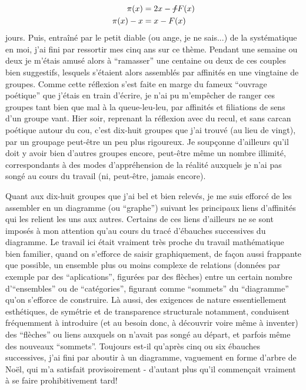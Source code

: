 \[
\begin{aligned}
\pi(x)&=2x-\deleted{f}F(x)\\
\pi(x)-x&=x-F(x)
\end{aligned}
\]
jours. Puis, entraîné par le petit diable (ou ange, je ne sais...) de la systématique en moi, j'ai fini par ressortir mes  cinq ans sur ce thème. Pendant une semaine ou deux je m'étais amusé alors à ``ramasser'' une centaine ou deux de ces couples bien suggestifs, lesquels s'étaient alors assemblés par affinités en une vingtaine de groupes. Comme cette réflexion s'est faite en marge du fameux ``ouvrage poétique'' que j'étais en train d'écrire, je n'ai pu m'empêcher de ranger ces groupes tant bien que mal à la queue-leu-leu, par affinités et filiations de sens d'un groupe vant. Hier soir, reprenant la réflexion avec du recul, et sans carcan poétique autour du cou, c'est dix-huit groupes que j'ai trouvé (au lieu de vingt), par un groupage peut-être un peu plus rigoureux. Je soupçonne d'ailleurs qu'il doit y avoir bien d'autres groupes encore, peut-être même un nombre illimité, correspondants à des modes d'appréhension de la réalité auxquels je n'ai pas songé au cours du travail (ni, peut-être, jamais encore).

Quant aux dix-huit groupes que j'ai bel et bien relevés, je me suis efforcé de les assembler en un diagramme (ou ``graphe'') suivant les principaux liens d'affinités qui les relient les uns aux autres. Certains de ces liens d'ailleurs ne se sont imposés à mon attention qu'au cours du tracé d'ébauches successives du diagramme. Le travail ici était vraiment très proche du travail mathématique bien familier, quand on s'efforce de saisir graphiquement, de façon aussi frappante que possible, un ensemble plus ou moins complexe de relations (données par exemple par des ``aplications'', figurées par des flèches) entre un certain nombre d'``ensembles'' ou de ``catégories'', figurant comme ``sommets'' du ``diagramme'' qu'on s'efforce de construire. Là aussi, des exigences de nature essentiellement esthétiques, de symétrie et de transparence structurale notamment, conduisent fréquemment à introduire (et au besoin donc, à découvrir voire même à inventer) des ``flèches'' ou liens auxquels on n'avait pas songé au départ, et parfois même des nouveaux ``sommets''. Toujours est-il qu'après cinq ou six ébauches successives, j'ai fini par aboutir à un diagramme, vaguement en forme d'arbre de Noël, qui m'a satisfait provisoirement - d'autant plus qu'il commençait vraiment à se faire prohibitivement tard!

